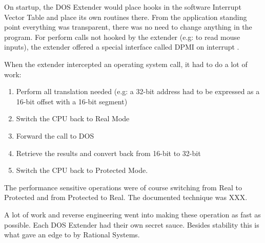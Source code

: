 \par
{}
On startup, the DOS Extender would place hooks in the software Interrupt Vector Table and place its own routines there. From the application standing point everything was transparent, there was no need to change anything in the program. For perform calls not hooked by the extender (e.g:  to read mouse inputs), the extender offered a special interface called DPMI on interrupt .\\
\par
{}
\par
When the extender intercepted an operating system call, it had to do a lot of work:
\begin{enumerate}
\item Perform all translation needed (e.g: a 32-bit address had to be expressed as a 16-bit offset with a 16-bit segment)
\item Switch the CPU back to Real Mode
\item Forward the call to DOS
\item Retrieve the results and convert back from 16-bit to 32-bit
\item Switch the CPU back to Protected Mode.
\end{enumerate} 

The performance sensitive operations were of course switching from Real to Protected and from Protected to Real. The documented technique was XXX.\\
\par
{}
\par
{}
\par
A lot of work and reverse engineering went into making these operation as fast as possible. Each DOS Extender had their own secret sauce. Besides stability this is what gave an edge to  by Rational Systems.\\
\\
\par 
{}
\par
{}
\par